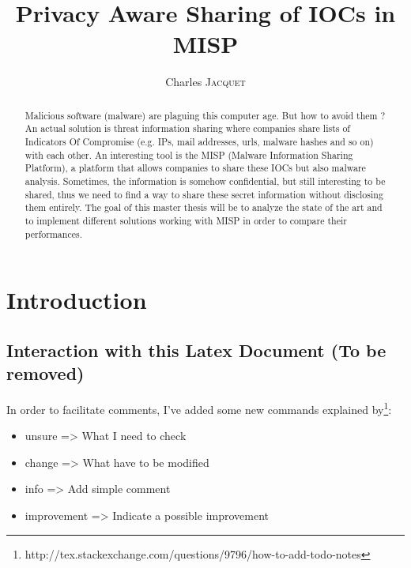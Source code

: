\documentclass{eplmastersthesis}
\title{Privacy Aware Sharing of IOCs in MISP}	%
\author{Charles \textsc{Jacquet}}	%
\begin{document}
\maketitle					%
\thispagestyle{empty}		%


\begin{abstract} 
Malicious software (malware) are plaguing this computer age. But how to avoid them ?
An actual solution is threat information sharing where companies share lists of Indicators Of Compromise (e.g. IPs, mail addresses, urls, malware hashes and so on) with each other.
An interesting tool is the MISP (Malware Information Sharing Platform), a platform that allows companies to share these IOCs but also malware analysis.
Sometimes, the information is somehow confidential, but still interesting to be shared, thus we need to find a way to share these secret information without disclosing them entirely.
The goal of this master thesis will be to analyze the state of the art and to implement different solutions working with MISP in order to compare their performances.
\end{abstract}

\tableofcontents

\chapter{Introduction}
\section{Interaction with this Latex Document (To be removed)}
In order to facilitate comments, I've added some new commands explained by\footnote{http://tex.stackexchange.com/questions/9796/how-to-add-todo-notes}:\\
\begin{itemize}
\item unsure => What I need to check
\item change => What have to be modified
\item info => Add simple comment
\item improvement => Indicate a possible improvement
\end{itemize}
\end{document}
